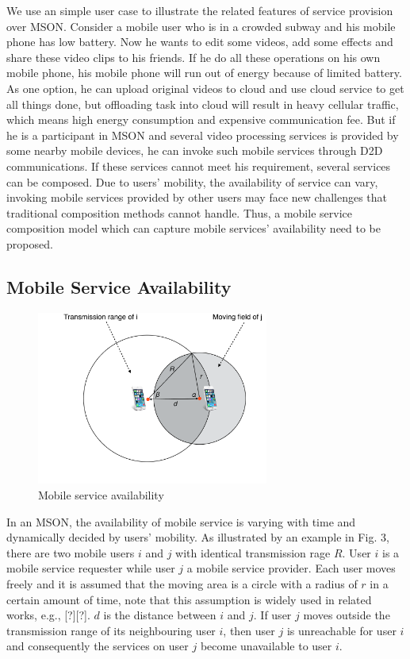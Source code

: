 \documentclass[journal]{IEEEtran}
\begin{document}
We use an simple user case to illustrate the related features of service provision over MSON. 
Consider a mobile user who is in a crowded subway and his mobile phone has low battery. 
Now he wants to edit some videos, add some effects and share these video clips to his friends. 
If he do all these operations on his own mobile phone, his mobile phone will run out of energy because of limited battery. 
As one option, he can upload original videos to cloud and use cloud service to get all things done, but offloading task into cloud will result in heavy cellular traffic, which means high energy consumption and expensive communication fee.
But if he is a participant in MSON and several video processing services is provided by some nearby mobile devices, he can invoke such mobile services through D2D communications. 
If these services cannot meet his requirement, several services can be composed. 
Due to users' mobility, the availability of service can vary, invoking mobile services provided by other users may face new challenges that traditional composition methods cannot handle. 
Thus, a mobile service composition model which can capture mobile services' availability need to be proposed.

\subsection{Mobile Service Availability}
\begin{figure}[!t]
\centering
\includegraphics[width=3in]{./img/pic3.pdf}
\caption{Mobile service availability}
\label{fig_sd}
\end{figure}
In an MSON, the availability of mobile service is varying with time and dynamically decided by users' mobility. 
As illustrated by an example in Fig. 3, there are two mobile users $i$ and $j$ with identical transmission rage $R$. User $i$ is a mobile service requester while user $j$ a mobile service provider. Each user moves freely and it is assumed that the moving area is a circle with a radius of $r$ in a certain amount of time, note that this assumption is widely used in related works, e.g., [?][?]. $d$ is the distance between $i$ and $j$. If user $j$ moves outside the transmission range of its neighbouring user $i$, then user $j$ is unreachable for user $i$ and consequently the services on user $j$ become unavailable to user $i$.
\end{document}

